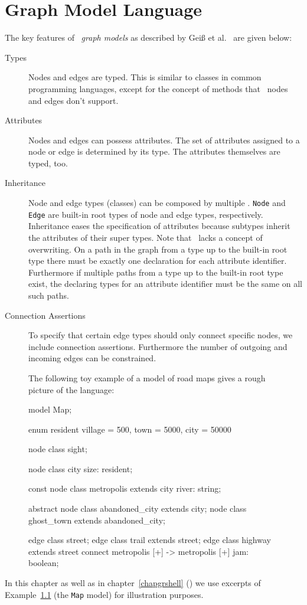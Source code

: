 \chapter{Graph Model Language}
\label{chapmodellang}
The key features of \GrG\ \emph{graph models} as described by Geiß et al.~\cite{GBGHS:06,KG:07} are given below:

\begin{description}
\item[Types] Nodes and edges are typed. 
  This is similar to classes in common programming languages, except for the concept of methods that \GrG\ nodes and edges don't support. 
\item[Attributes] Nodes and edges can possess attributes. The set of attributes assigned to a node or edge is determined by its type. The attributes themselves are typed, too.
\item[Inheritance] Node and edge types (classes) can be composed by multiple . \texttt{Node} and \texttt{Edge} are built-in root types of node and edge types, respectively. Inheritance eases the specification of attributes because subtypes inherit the attributes of their super types. Note that \GrG\ lacks a concept of overwriting. On a path in the  graph from a type up to the built-in root type there must be exactly one declaration for each attribute identifier. Furthermore if multiple paths from a type up to the built-in root type exist, the declaring types for an attribute identifier must be the same on all such paths.
\item[Connection Assertions] To specify that certain edge types should only connect specific nodes, we include connection assertions. Furthermore the number of outgoing and incoming edges can be constrained.
\end{description}

\begin{figure}[htbf]
\begin{example}\label{ex:model:map}
The following toy example of a model of road maps gives a rough picture of the language:
\begin{grgen}
model Map;

enum resident {village = 500, town = 5000, city = 50000}

node class sight;

node class city {
	size: resident;
}

const node class metropolis extends city {
  river: string;
}  

abstract node class abandoned_city extends city;
node class ghost_town extends abandoned_city;

edge class street;
edge class trail extends street;
edge class highway extends street
    connect metropolis [+] -> metropolis [+]
{
    jam: boolean;
}
\end{grgen}
\end{example}
\end{figure}
In this chapter as well as in chapter~\ref{chapgrshell} (\GrShell) we use excerpts of Example~\ref{ex:model:map} (the \texttt{Map} model) for illustration purposes.

